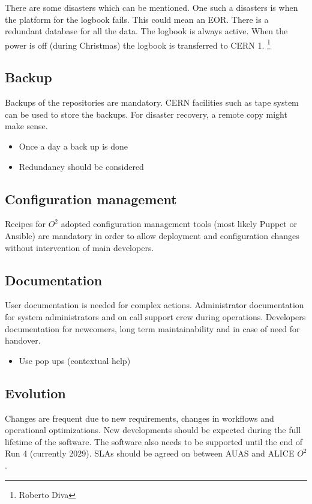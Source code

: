 There are some disasters which can be mentioned. One such a disasters is when the platform for the logbook fails. This could mean an EOR. There is a redundant database for all the data. The logbook is always active. When the power is off (during Christmas) the logbook is transferred to CERN 1. \footnote{Roberto Diva}


\subsection{Backup}
Backups of the repositories are mandatory. CERN facilities such as tape system can be used to store the backups. For disaster recovery, a remote copy might make sense. 
\begin{itemize}
  \item Once a day a back up is done
  \item Redundancy should be considered
\end{itemize}

\subsection{Configuration management}
Recipes for $O^2$ adopted configuration management tools (most likely Puppet or Ansible) are mandatory in order to allow deployment and configuration changes without intervention of main developers. 

\subsection{Documentation}
User documentation is needed for complex actions. Administrator documentation for system administrators and on call support crew during operations. Developers documentation for newcomers, long term maintainability and in case of need for handover. 
\begin{itemize}
  \item Use pop ups (contextual help)
\end{itemize}

\subsection{Evolution}
Changes are frequent due to new requirements, changes in workflows and operational optimizations. New developments should be expected during the full lifetime of the software. The software also needs to be supported until the end of Run 4 (currently 2029). SLAs should be agreed on between AUAS and ALICE $O^2$.

